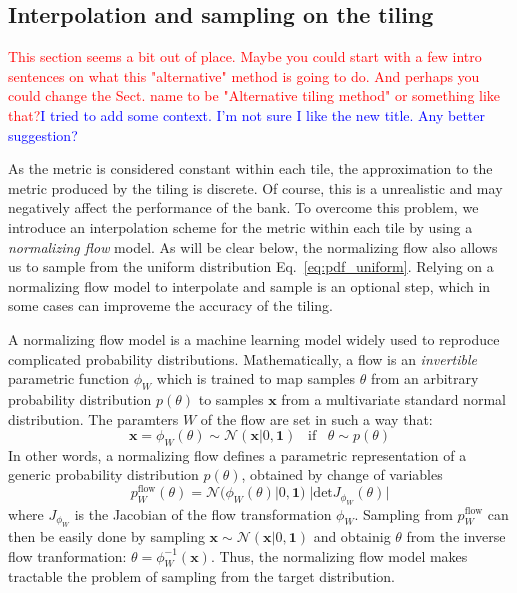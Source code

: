 \documentclass[twocolumn,showpacs,preprintnumbers,nofootinbib,prd,
superscriptaddress,10pt]{revtex4-2}
\begin{document}
\subsection{Interpolation and sampling on the tiling} \label{sec:normalizing_flow}
\textcolor{red}{This section seems a bit out of place. Maybe you could start with a few intro sentences on what this "alternative" method is going to do. And perhaps you could change the Sect. name to be "Alternative tiling method" or something like that?}\textcolor{blue}{I tried to add some context. I'm not sure I like the new title. Any better suggestion?}

As the metric is considered constant within each tile, the approximation to the metric produced by the tiling is discrete. Of course, this is a unrealistic and may negatively affect the performance of the bank. To overcome this problem, we introduce an interpolation scheme for the metric within each tile by using a {\it normalizing flow} model. As will be clear below, the normalizing flow also allows us to sample from the uniform distribution Eq.~\eqref{eq:pdf_uniform}.
Relying on a normalizing flow model to interpolate and sample is an optional step, which in some cases can improveme the accuracy of the tiling. 

A normalizing flow model \cite{norm_flow, nflows_paper, Kobyzev_2021, Papamakarios_thesis} is a machine learning model widely used to reproduce complicated probability distributions.
Mathematically, a flow is an {\it invertible} parametric function $\phi_W$ which is trained to map samples $\theta$ from an arbitrary probability distribution $p(\theta)$ to samples $\mathbf{x}$ from a multivariate standard normal distribution.
The paramters $W$ of the flow are set in such a way that:
\begin{equation}
	\mathbf{x} = \phi_W(\theta) \sim \mathcal{N}(\mathbf{x}|0,\mathbf{1}) \;\;\; \text{if} \;\;\;  \theta \sim p(\theta)
\end{equation}
%
In other words, a normalizing flow defines a parametric representation of a generic probability distribution $p(\theta)$, obtained by change of variables
\begin{equation}\label{eq:p_flow}
	p^\text{flow}_W(\theta) = \mathcal{N}(\phi_W(\theta)|0,\mathbf{1}) \; |\text{det} J_{\phi_W}(\theta)|
\end{equation}
where $J_{\phi_W}$ is the Jacobian of the flow transformation $\phi_W$.
Sampling from $p^\text{flow}_W$ can then be easily done by sampling $\mathbf{x} \sim \mathcal{N}(\mathbf{x}|0,\mathbf{1})$ and obtainig $\theta$ from the inverse flow tranformation: $\theta = \phi_W^{-1}(\mathbf{x})$.
Thus, the normalizing flow model makes tractable the problem of sampling from the target distribution.
\end{document}
